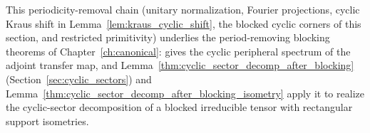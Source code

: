 This periodicity-removal chain (unitary normalization, Fourier
projections, cyclic Kraus shift in Lemma~\ref{lem:kraus_cyclic_shift}, the
blocked cyclic corners of this section, and restricted primitivity)
underlies the period-removing blocking theorems of
Chapter~\ref{ch:canonical}: \cite[Theorem~6.6]{Wolf2012Quantum} gives the
cyclic peripheral spectrum of the adjoint transfer map, and
Lemma~\ref{thm:cyclic_sector_decomp_after_blocking} (Section~\ref{sec:cyclic_sectors})
and Lemma~\ref{thm:cyclic_sector_decomp_after_blocking_isometry} apply it
to realize the cyclic-sector decomposition of a blocked irreducible tensor
with rectangular support isometries.

